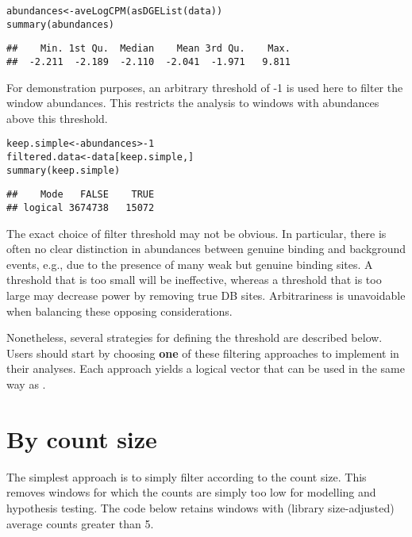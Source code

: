 \documentclass{report}\usepackage[]{graphicx}\usepackage[usenames,dvipsnames]{color}
\newcommand{\hlnum}[1]{\textcolor[rgb]{0.816,0.125,0.439}{#1}}%
\newcommand{\hlopt}[1]{\textcolor[rgb]{0,0,0}{#1}}%
\newcommand{\hlstd}[1]{\textcolor[rgb]{0.251,0.251,0.251}{#1}}%
\newcommand{\hlkwb}[1]{\textcolor[rgb]{0,0,0}{#1}}%
\newcommand{\hlkwd}[1]{\textcolor[rgb]{0.878,0.439,0.125}{#1}}%
\newenvironment{knitrout}{}{} %
\begin{document}
\begin{knitrout}
\color{fgcolor}\begin{kframe}
\begin{alltt}
\hlstd{abundances} \hlkwb{<-} \hlkwd{aveLogCPM}\hlstd{(}\hlkwd{asDGEList}\hlstd{(data))}
\hlkwd{summary}\hlstd{(abundances)}
\end{alltt}
\begin{verbatim}
##    Min. 1st Qu.  Median    Mean 3rd Qu.    Max. 
##  -2.211  -2.189  -2.110  -2.041  -1.971   9.811
\end{verbatim}
\end{kframe}
\end{knitrout}

For demonstration purposes, an arbitrary threshold of -1 is used here to filter the window abundances. 
This restricts the analysis to windows with abundances above this threshold.

\begin{knitrout}
\color{fgcolor}\begin{kframe}
\begin{alltt}
\hlstd{keep.simple} \hlkwb{<-} \hlstd{abundances} \hlopt{> -}\hlnum{1}
\hlstd{filtered.data} \hlkwb{<-} \hlstd{data[keep.simple,]}
\hlkwd{summary}\hlstd{(keep.simple)}
\end{alltt}
\begin{verbatim}
##    Mode   FALSE    TRUE 
## logical 3674738   15072
\end{verbatim}
\end{kframe}
\end{knitrout}

The exact choice of filter threshold may not be obvious.
In particular, there is often no clear distinction in abundances between genuine binding and background events, e.g., due to the presence of many weak but genuine binding sites.
A threshold that is too small will be ineffective, whereas a threshold that is too large may decrease power by removing true DB sites.
Arbitrariness is unavoidable when balancing these opposing considerations.

Nonetheless, several strategies for defining the threshold are described below.
Users should start by choosing \textbf{one} of these filtering approaches to implement in their analyses.
Each approach yields a logical vector that can be used in the same way as .

\section{By count size}
The simplest approach is to simply filter according to the count size.
This removes windows for which the counts are simply too low for modelling and hypothesis testing.
The code below retains windows with (library size-adjusted) average counts greater than 5. 
\end{document}
